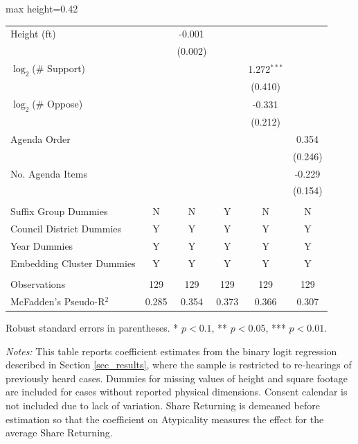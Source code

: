 \begin{table}[H]
\begin{adjustbox}{max height=0.42\textheight}
\begin{threeparttable}
\begin{tabular}{lccccc}
Height (ft)  &  & -0.001$^{}$ &  &  &  \\
 &  & (0.002) &  &  &  \\ [1.8ex]
$\log_2$(\# Support)  &  &  &  & 1.272$^{***}$ &  \\
 &  &  &  & (0.410) &  \\ [1.8ex]
$\log_2$(\# Oppose)  &  &  &  & -0.331$^{}$ &  \\
 &  &  &  & (0.212) &  \\ [1.8ex]
Agenda Order  &  &  &  &  & 0.354$^{}$ \\
 &  &  &  &  & (0.246) \\ [1.8ex]
No. Agenda Items  &  &  &  &  & -0.229$^{}$ \\
 &  &  &  &  & (0.154) \\ [1.8ex]

 & & & & \\ 
Suffix Group Dummies  & N  & N  & Y  & N  & N  \\ 
Council District Dummies  & Y  & Y  & Y  & Y  & Y  \\ 
Year Dummies  & Y  & Y  & Y  & Y  & Y  \\ 
Embedding Cluster Dummies  & Y  & Y  & Y  & Y  & Y  \\ 

 & & & & \\ 
Observations  & 129 & 129 & 129 & 129 & 129 \\ [1.8ex]
McFadden's Pseudo-R$^2$ & 0.285 & 0.354 & 0.373 & 0.366 & 0.307 \\ [1.8ex]
\bottomrule
\end{tabular}
\begin{tablenotes}[flushleft]
\footnotesize
\item Robust standard errors in parentheses. * $p<0.1$, ** $p<0.05$, *** $p<0.01$.
\item \textit{Notes:} This table reports coefficient estimates from the binary logit regression described in Section \ref{sec_results}, where the sample is restricted to re-hearings of previously heard cases. Dummies for missing values of height and square footage are included for cases without reported physical dimensions. Consent calendar is not included due to lack of variation. Share Returning is demeaned before estimation so that the coefficient on Atypicality measures the effect for the average Share Returning.
\end{tablenotes}
\end{threeparttable}
\end{adjustbox}
\end{table}
